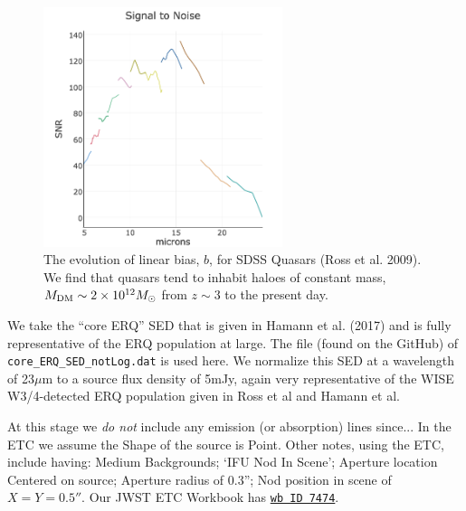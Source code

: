 \begin{figure}
  \begin{center}
    \includegraphics[height=7.0cm,width=7.0cm]{../Figures/current_wavelength_vsSNR.png}
    \end{center}
  \caption{The evolution of linear bias, $b$, for SDSS Quasars (Ross et al. 2009).  
    We find that quasars tend to inhabit haloes of constant mass, $M_{\rm DM} \sim 2 \times 10^{12} M_{\odot}$ 
    from $z\sim3$ to the present day.} 
  \label{fig:test-fig}
\end{figure}


\smallskip \smallskip 
\noindent
We take the ``core ERQ'' SED that is given in Hamann et al. (2017) and
is fully representative of the ERQ population at large.  The file
(found on the GitHub) of {\tt core\_ERQ\_SED\_notLog.dat} is used
here.  We normalize this SED at a wavelength of 23$\mu$m to a source
flux density of 5mJy, again very representative of the WISE
W3/4-detected ERQ population given in Ross et al and Hamann et al.

\smallskip \smallskip 
\noindent
At this stage we {\it do not} include any emission (or absorption)
lines since...  In the ETC we assume the Shape of the source is Point.
Other notes, using the ETC, include having: Medium Backgrounds; `IFU
Nod In Scene'; Aperture location Centered on source; Aperture radius
of 0.3''; Nod position in scene of $X=Y=0.5''$.  Our JWST ETC Workbook
has \href{https://jwst.etc.stsci.edu/workbook.html?wb_id=7474}{{\tt wb
ID 7474}}.

